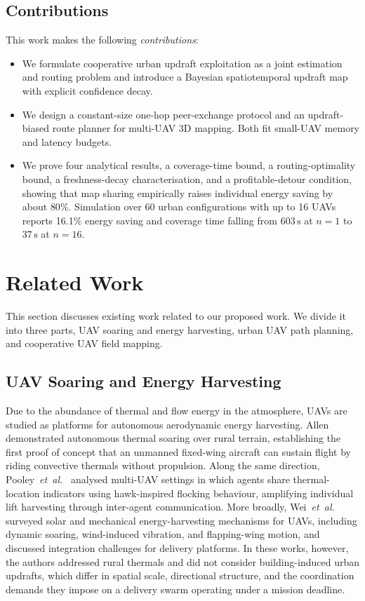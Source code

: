 \documentclass[conference]{IEEEtran}
\newcommand{\rd}[1]{#1}   %
\begin{document}
\subsection{Contributions}
This work makes the following \textit{contributions}:
\begin{itemize}
\item We formulate cooperative urban updraft exploitation as
a joint estimation and routing problem and introduce
a Bayesian spatiotemporal updraft map with explicit
confidence decay.
\item We design a constant-size \rd{one-hop peer-exchange protocol} and an updraft-biased route
planner for multi-UAV 3D mapping. Both fit
small-UAV memory and latency budgets.
\item We prove four analytical results, a coverage-time bound,
a routing-optimality bound, a freshness-decay characterisation,
and a profitable-detour condition, showing \rd{that map sharing empirically raises individual energy saving by about $80\%$}. Simulation over 60 urban configurations with up to
16 UAVs \rd{reports 16.1\%} energy saving and coverage
time falling from \rd{$603\,\text{s}$} at $n=1$ to \rd{$37\,\text{s}$} at $n=16$.
\end{itemize}

\section{Related Work}

This section discusses existing work related to our proposed
work. We divide it into three parts, UAV soaring and energy
harvesting, urban UAV path planning, and cooperative UAV
field mapping.

\subsection{UAV Soaring and Energy Harvesting}

Due to the abundance of thermal and flow energy in the
atmosphere, UAVs are studied as platforms for autonomous
aerodynamic energy harvesting. Allen~\cite{allen} demonstrated autonomous thermal soaring over rural terrain, establishing the
first proof of concept that an unmanned fixed-wing aircraft can
sustain flight by riding convective thermals without propulsion. Along the same direction, Pooley~\textit{et~al.}~\cite{pooley} analysed
multi-UAV settings in which agents share thermal-location
indicators using hawk-inspired flocking behaviour, amplifying
individual lift harvesting through inter-agent communication.
More broadly, Wei~\textit{et~al.}~\cite{wei} surveyed solar and mechanical
energy-harvesting mechanisms for UAVs, including dynamic
soaring, wind-induced vibration, and flapping-wing motion,
and discussed integration challenges for delivery platforms. In
these works, however, the authors addressed rural thermals and
did not consider building-induced urban updrafts, which differ
in spatial scale, directional structure, and the coordination
demands they impose on a delivery swarm operating under
a mission deadline.
\end{document}
